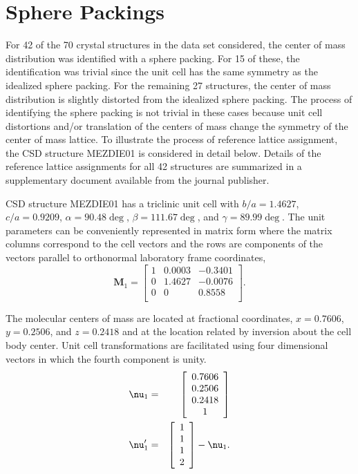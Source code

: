\documentclass{iucr}              %
\begin{document}
\section{Sphere Packings }

For 42 of the 70 crystal structures in the data set considered, the center of mass distribution was identified with a sphere packing.  For 15 of these, the identification was trivial since the unit cell has the same symmetry as the idealized sphere packing.  For the remaining 27 structures, the center of mass distribution is slightly distorted from the idealized sphere packing.  The process of identifying the sphere packing is not trivial in these cases because unit cell distortions and/or translation of the centers of mass change the symmetry of the center of mass lattice.  To illustrate the process of reference lattice assignment, the CSD structure MEZDIE01 is considered in detail below.  Details of the reference lattice assignments for all 42 structures are summarized in a supplementary document available from the journal publisher.

CSD structure MEZDIE01 has a triclinic unit cell with $b/a=1.4627$, $c/a=0.9209$, $\alpha=90.48\deg$, $\beta=111.67\deg$, and $\gamma=89.99\deg$.  The unit parameters can be conveniently represented in matrix form where the matrix columns correspond to the cell vectors and the rows are components of the vectors parallel to orthonormal laboratory frame coordinates,
\begin{equation}
   \mathbf{M}_1=\left[
     \begin{array}{ccc}
        1& 0.0003& -0.3401\\
        0& 1.4627& -0.0076\\
        0& 0& 0.8558\\
     \end{array}
  \right].
\end{equation}

The molecular centers of mass are located at fractional coordinates, $x=0.7606$, $y=0.2506$, and $z=0.2418$ and at the location related by inversion about the cell body center.  Unit cell transformations are facilitated using four dimensional vectors in which the fourth component is unity.
\begin{eqnarray}
   \mbox{\boldmath$\nu$}_1&=&\left[
     \begin{array}{c}
        0.7606\\
        0.2506\\
        0.2418\\
        1\\
     \end{array}
  \right]\\
   \mbox{\boldmath$\nu$}^\prime_1&=&\left[
     \begin{array}{c}
        1\\
        1\\
        1\\
        2\\
     \end{array}
  \right]-\mbox{\boldmath$\nu$}_1.
\end{eqnarray}
\end{document}
